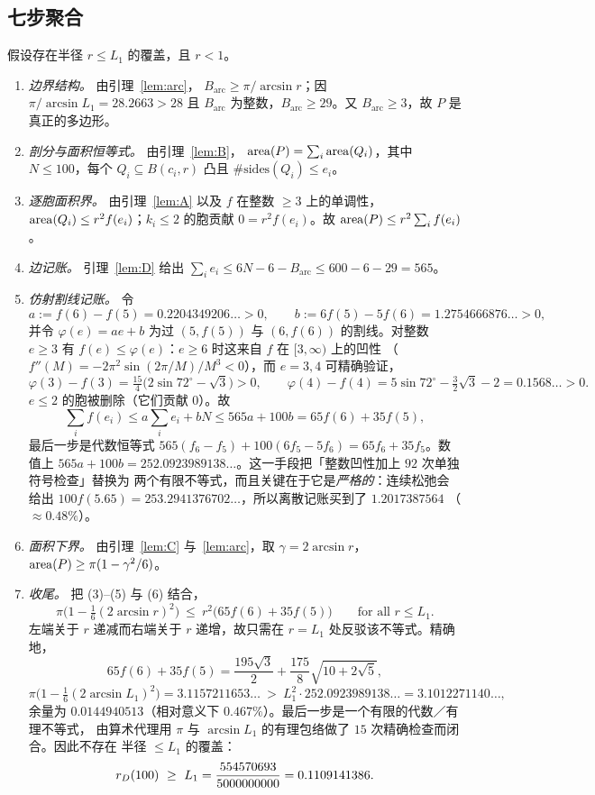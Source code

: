 \subsection{七步聚合}

假设存在半径 $r\le L_1$ 的覆盖，且 $r<1$。

\begin{enumerate}[leftmargin=1.8em,itemsep=3pt]
\item[(1)] \emph{边界结构。} 由引理~\ref{lem:arc}，
$B_{\mathrm{arc}}\ge\pi/\arcsin r$；因 $\pi/\arcsin L_1=28.2663>28$ 且
$B_{\mathrm{arc}}$ 为整数，$B_{\mathrm{arc}}\ge29$。又 $B_{\mathrm{arc}}\ge3$，故 $P$
是真正的多边形。
\item[(2)] \emph{剖分与面积恒等式。} 由引理~\ref{lem:B}，
$\operatorname{area}(P)=\sum_i\operatorname{area}(Q_i)$，其中 $N\le100$，每个 $Q_i\subseteq B(c_i,r)$ 凸且
$\#\text{sides}(Q_i)\le e_i$。
\item[(3)] \emph{逐胞面积界。} 由引理~\ref{lem:A} 以及 $f$ 在整数 $\ge3$ 上的单调性，
$\operatorname{area}(Q_i)\le r^2f(e_i)$；$k_i\le2$ 的胞贡献 $0=r^2f(e_i)$。故
$\operatorname{area}(P)\le r^2\sum_if(e_i)$。
\item[(4)] \emph{边记账。} 引理~\ref{lem:D} 给出
$\sum_ie_i\le6N-6-B_{\mathrm{arc}}\le600-6-29=565$。
\item[(5)] \emph{仿射割线记账。} 令
\[
a:=f(6)-f(5)=0.2204349206\ldots>0,\qquad
b:=6f(5)-5f(6)=1.2754666876\ldots>0,
\]
并令 $\varphi(e)=ae+b$ 为过 $(5,f(5))$ 与 $(6,f(6))$ 的割线。对整数 $e\ge3$ 有
$f(e)\le\varphi(e)$：$e\ge6$ 时这来自 $f$ 在 $[3,\infty)$ 上的凹性
（$f''(M)=-2\pi^2\sin(2\pi/M)/M^3<0$），而 $e=3,4$ 可精确验证，
\[
\varphi(3)-f(3)=\tfrac{15}4\bigl(2\sin72^\circ-\sqrt3\bigr)>0,\qquad
\varphi(4)-f(4)=5\sin72^\circ-\tfrac32\sqrt3-2=0.1568\ldots>0 .
\]
$e\le2$ 的胞被删除（它们贡献 $0$）。故
\[
\sum_if(e_i)\le a\sum_ie_i+bN\le565a+100b=65f(6)+35f(5),
\]
最后一步是代数恒等式 $565(f_6-f_5)+100(6f_5-5f_6)=65f_6+35f_5$。数值上
$565a+100b=252.0923989138\ldots$。这一手段把「整数凹性加上 $92$ 次单独符号检查」替换为
两个有限不等式，而且关键在于它是\emph{严格的}：连续松弛会给出
$100f(5.65)=253.2941376702\ldots$，所以离散记账买到了 $1.2017387564$
（$\approx0.48\%$）。
\item[(6)] \emph{面积下界。} 由引理~\ref{lem:C} 与~\ref{lem:arc}，取
$\gamma=2\arcsin r$，$\operatorname{area}(P)\ge\pi(1-\gamma^2/6)$。
\item[(7)] \emph{收尾。} 把 (3)--(5) 与 (6) 结合，
\[
\pi\bigl(1-\tfrac16(2\arcsin r)^2\bigr)\ \le\ r^2\bigl(65f(6)+35f(5)\bigr)
\qquad\text{for all }r\le L_1 .
\]
左端关于 $r$ 递减而右端关于 $r$ 递增，故只需在 $r=L_1$ 处反驳该不等式。精确地，
\[
65f(6)+35f(5)=\frac{195\sqrt3}{2}+\frac{175}{8}\sqrt{10+2\sqrt5},
\]
\[
\pi\bigl(1-\tfrac16(2\arcsin L_1)^2\bigr)=3.1157211653\ldots
\ >\ L_1^2\cdot252.0923989138\ldots=3.1012271140\ldots,
\]
余量为 $0.0144940513$（相对意义下 $0.467\%$）。最后一步是一个有限的代数／有理不等式，
由算术代理用 $\pi$ 与 $\arcsin L_1$ 的有理包络做了 $15$ 次精确检查而闭合。因此不存在
半径 $\le L_1$ 的覆盖：
\[
\rD(100)\ \ge\ L_1=\frac{554570693}{5000000000}=0.1109141386 .
\]
\end{enumerate}

